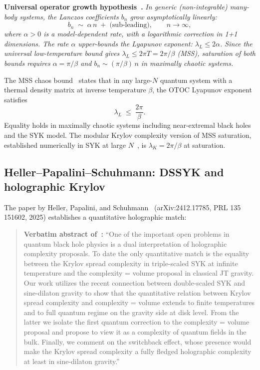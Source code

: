 \documentclass[12pt,a4paper]{article}
\theoremstyle{definition}
\newcommand{\lK}{\lambda_K}
\newcommand{\lL}{\lambda_L}
\begin{document}
\textbf{Universal operator growth hypothesis~\cite{Parker2019}.}
\emph{In generic (non-integrable) many-body systems, the Lanczos
coefficients $b_n$ grow asymptotically linearly:}
\begin{equation}
  b_n \;\sim\; \alpha\, n \;+\; \text{(sub-leading)},
  \qquad n \to \infty,
  \label{eq:lanczos-linear}
\end{equation}
\emph{where $\alpha > 0$ is a model-dependent rate, with a logarithmic
correction in 1+1 dimensions.
The rate $\alpha$ upper-bounds the Lyapunov exponent:
$\lL \le 2\alpha$.
Since the universal low-temperature bound gives $\lL \le 2\pi T = 2\pi/\beta$
(MSS), saturation of both bounds requires $\alpha = \pi/\beta$ and
$b_n \sim (\pi/\beta)\,n$ in maximally chaotic systems.}

The MSS chaos bound~\cite{MSS2016} states that in any large-$N$ quantum
system with a thermal density matrix at inverse temperature $\beta$,
the OTOC Lyapunov exponent satisfies
\begin{equation}
  \lL \;\le\; \frac{2\pi}{\beta}.
  \label{eq:mss}
\end{equation}
Equality holds in maximally chaotic systems including near-extremal
black holes and the SYK model.
The modular Krylov complexity version of MSS saturation, established
numerically in SYK at large $N$~\cite{Parker2019}, is
$\lK = 2\pi/\beta$ at saturation.

\subsection{Heller--Papalini--Schuhmann: DSSYK and holographic Krylov}

The paper by Heller, Papalini, and Schuhmann~\cite{HPS2024}
(arXiv:2412.17785, PRL 135 151602, 2025) establishes a quantitative
holographic match:

\begin{quote}
\textbf{Verbatim abstract of~\cite{HPS2024}:}
``One of the important open problems in quantum black hole physics is
a dual interpretation of holographic complexity proposals.
To date the only quantitative match is the equality between the Krylov
spread complexity in triple-scaled SYK at infinite temperature and the
complexity = volume proposal in classical JT gravity.
Our work utilizes the recent connection between double-scaled SYK and
sine-dilaton gravity to show that the quantitative relation between Krylov
spread complexity and complexity = volume extends to finite temperatures
and to full quantum regime on the gravity side at disk level.
From the latter we isolate the first quantum correction to the
complexity = volume proposal and propose to view it as a complexity of
quantum fields in the bulk.
Finally, we comment on the switchback effect, whose presence would make
the Krylov spread complexity a fully fledged holographic complexity at
least in sine-dilaton gravity.''
\end{quote}
\end{document}
